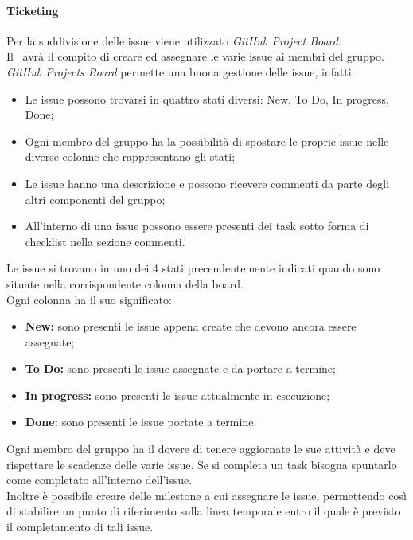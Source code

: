       \paragraph{Ticketing}
        Per la suddivisione delle issue viene utilizzato \textit{GitHub Project Board}.\\
        Il \roleProjectManager\ avrà il compito di creare ed assegnare le varie issue ai membri del gruppo.\\
        \textit{GitHub Projects Board} permette una buona gestione delle issue, infatti:
        \begin{itemize}
          \item Le issue possono trovarsi in quattro stati diversi: New, To Do, In progress, Done;
          \item Ogni membro del gruppo ha la possibilità di spostare le proprie issue nelle diverse colonne che rappresentano gli stati;
          \item Le issue hanno una descrizione e possono ricevere commenti da parte degli altri componenti del gruppo;
          \item All'interno di una issue possono essere presenti dei task sotto forma di checklist nella sezione commenti.
        \end{itemize}
        Le issue si trovano in uno dei 4 stati precendentemente indicati quando sono situate nella corrispondente colonna della board.\\
        Ogni colonna ha il suo significato:
        \begin{itemize}
          \item \textbf{New:} sono presenti le issue appena create che devono ancora essere assegnate;
          \item \textbf{To Do:} sono presenti le issue assegnate e da portare a termine;
          \item \textbf{In progress:} sono presenti le issue attualmente in esecuzione;
          \item \textbf{Done:} sono presenti le issue portate a termine.
        \end{itemize}
        Ogni membro del gruppo ha il dovere di tenere aggiornate le sue attività e deve rispettare le scadenze delle varie issue.
        Se si completa un task bisogna spuntarlo come completato all'interno dell'issue.\\
        Inoltre è possibile creare delle milestone a cui assegnare le issue, permettendo così di stabilire un punto di riferimento 
        sulla linea temporale entro il quale è previsto il completamento di tali issue.


